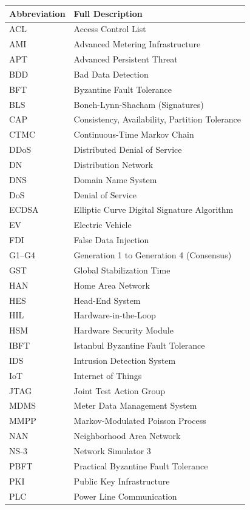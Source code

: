 \documentclass[12pt, oneside, a4paper]{report}
\theoremstyle{definition}
\theoremstyle{remark}
\begin{document}
\begin{longtable}{ll}
\toprule
\textbf{Abbreviation} & \textbf{Full Description} \\
\midrule
ACL & Access Control List \\
AMI & Advanced Metering Infrastructure \\
APT & Advanced Persistent Threat \\
BDD & Bad Data Detection \\
BFT & Byzantine Fault Tolerance \\
BLS & Boneh-Lynn-Shacham (Signatures) \\
CAP & Consistency, Availability, Partition Tolerance \\
CTMC & Continuous-Time Markov Chain \\
DDoS & Distributed Denial of Service \\
DN & Distribution Network \\
DNS & Domain Name System \\
DoS & Denial of Service \\
ECDSA & Elliptic Curve Digital Signature Algorithm \\
EV & Electric Vehicle \\
FDI & False Data Injection \\
G1--G4 & Generation 1 to Generation 4 (Consensus) \\
GST & Global Stabilization Time \\
HAN & Home Area Network \\
HES & Head-End System \\
HIL & Hardware-in-the-Loop \\
HSM & Hardware Security Module \\
IBFT & Istanbul Byzantine Fault Tolerance \\
IDS & Intrusion Detection System \\
IoT & Internet of Things \\
JTAG & Joint Test Action Group \\
MDMS & Meter Data Management System \\
MMPP & Markov-Modulated Poisson Process \\
NAN & Neighborhood Area Network \\
NS-3 & Network Simulator 3 \\
PBFT & Practical Byzantine Fault Tolerance \\
PKI & Public Key Infrastructure \\
PLC & Power Line Communication \\

\end{longtable}
\end{document}
